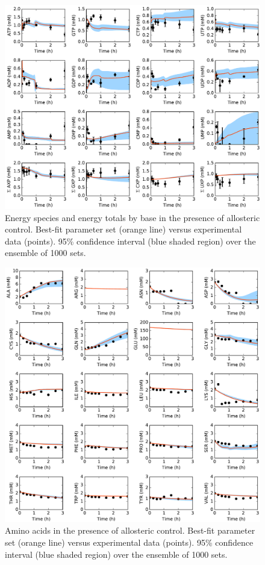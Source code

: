 \documentclass[12pt]{article}
\begin{document}
\begin{figure}[ht]
\centering
\includegraphics[width=1.00\textwidth]{./Figures/Energy.pdf}
\caption{Energy species and energy totals by base in the presence of allosteric control. Best-fit parameter set (orange line) versus experimental data (points). 95\% confidence interval (blue shaded region) over the ensemble of 1000 sets.}
\label{fig:Energy}
\end{figure}

\begin{figure}[ht]
\centering
\includegraphics[width=1.00\textwidth]{./Figures/Amino.pdf}
\caption{Amino acids in the presence of allosteric control. Best-fit parameter set (orange line) versus experimental data (points). 95\% confidence interval (blue shaded region) over the ensemble of 1000 sets.}
\label{fig:Amino}
\end{figure}
\end{document}
